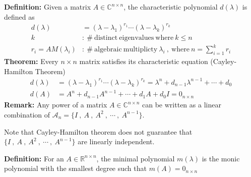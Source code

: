 \documentclass[twoside]{article}
\begin{document}
\textbf{Definition:} Given a matrix $A \in \mathbb{C}^{n \times n}$, the characteristic polynomial $d(\lambda)$ is defined as 
%
\begin{align*}
d(\lambda) &= (\lambda - \lambda_1)^{r_1} \cdots (\lambda - \lambda_k)^{r_k} 
\\
k &: \ \# \ \mathrm{distinct} \ \mathrm{eigenvalues}  \ \mathrm{where} \ k \leq n
\\
r_i = AM(\lambda_i) &: \ \# \ \mathrm{algebraic} \ \mathrm{multiplicty}  \ \lambda_i \ , \ \mathrm{where} \ n = \sum_{i=1}^k r_i
\end{align*}
% 
\textbf{Theorem:} Every $n \times n$ matrix satisfies its characteristic equation (Cayley-Hamilton Theorem)
%
\begin{align*}
d(\lambda) &= (\lambda - \lambda_1)^{r_1} \cdots (\lambda - \lambda_k)^{r_k} = \lambda^n + d_{n-1} \lambda^{n-1} + \cdots + d_0
\\
d(A) &= A^n + d_{n-1} A^{n-1} + \cdots + d_1 A + d_0 I = 0_{n \times n} 
\end{align*}
%
\textbf{Remark:} Any power of a matrix $A \in \mathbb{C}^{n \times n}$ can be written as a linear combination of 
$\mathcal{A}_n = \lbrace I \ , \ A \ , \ A^2 \ , \ \cdots \ , \ A^{n-1} \rbrace$.

Note that Cayley-Hamilton theorem does not guarantee that $\lbrace I \ , \ A \ , \ A^2 \ , \ \cdots \ , \ A^{n-1} \rbrace$ are linearly independent. 

\textbf{Definition:} For an $A \in \mathbb{R}^{n \times n}$, the minimal polynomial $m(\lambda)$ is the monic polynomial with the smallest degree such that 
$m(A) = 0_{n\times n}$
\end{document}
